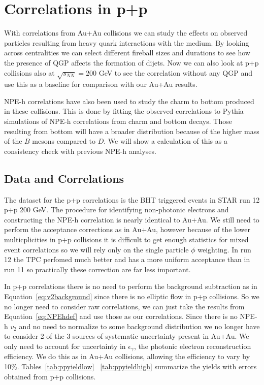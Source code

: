 \section{Correlations in p+p}

With correlations from Au+Au collisions we can study the effects on observed particles resulting from heavy quark interactions with the medium. By looking across centralities we can select different fireball sizes and durations to see how the presence of QGP affects the formation of dijets. Now we can also look at p+p collisions also at $\sqrt{s_{NN}} = 200$ GeV to see the correlation without any QGP and use this as a baseline for comparison with our Au+Au results. 

NPE-h correlations have also been used to study the charm to bottom produced in these collisions. This is done by fitting the observed correlations to Pythia simulations of NPE-h correlations from charm and bottom decays. Those resulting from bottom will have a broader distribution because of the higher mass of the $B$ mesons compared to $D$. We will show a calculation of this as a consistency check with previous NPE-h analyses.

\subsection{Data and Correlations}

The dataset for the p+p correlations is the BHT triggered events in STAR run 12 p+p 200 GeV. The procedure for identifying non-photonic electrons and constructing the NPE-h correlation is nearly identical to Au+Au. We still need to perform the acceptance corrections as in Au+Au, however because of the lower multicplicities in p+p collisions it is difficult to get enough statistics for mixed event correlations so we will rely only on the single particle $\phi$ weighting. In run 12 the TPC perfomed much better and has a more uniform acceptance than in run 11 so practically these correction are far less important. 

In p+p correlations there is no need to perform the background subtraction as in Equation~\ref{eq:v2background} since there is no elliptic flow in p+p collisions. So we no longer need to consider raw correlations, we can just take the results from Equation~\ref{eq:NPEhdef} and use those as our correlations. Since there is no NPE-h $v_2$ and no need to normalize to some background distribution we no longer have to consider 2 of the 3 sources of systematic uncertainty present in Au+Au. We only need to account for uncertainty in $\epsilon_\gamma$, the photonic electron reconstruction efficiency. We do this as in Au+Au collisions, allowing the efficiency to vary by 10\%. Tables~\ref{tab:ppyieldlow} ~\ref{tab:ppyieldhigh}  summarize the yields with errors obtained from p+p collisions.

